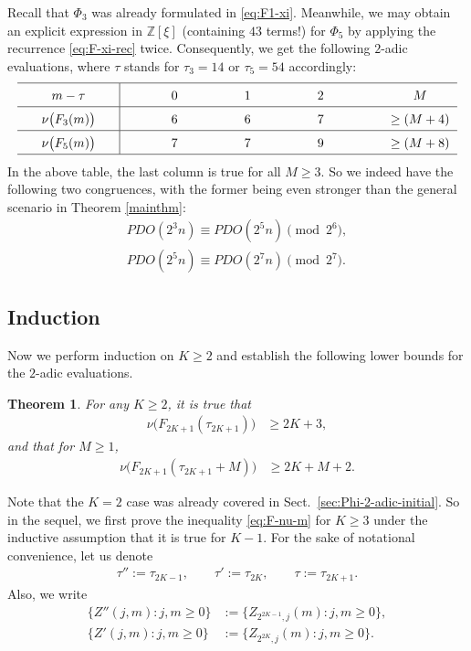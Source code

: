 \documentclass[12pt,reqno]{amsart}
\numberwithin{equation}{section}
\theoremstyle{theorem}
\newtheorem{theorem}{Theorem}
\theoremstyle{definition}
\begin{document}
Recall that $\Phi_3$ was already formulated in \eqref{eq:F1-xi}. Meanwhile, we may obtain an explicit expression in $\mathbb{Z}[\xi]$ (containing $43$ terms!) for $\Phi_5$ by applying the recurrence \eqref{eq:F-xi-rec} twice. Consequently, we get the following $2$-adic evaluations, where $\tau$ stands for $\tau_3=14$ or $\tau_5=54$ accordingly:
\begin{align*}
	\renewcommand\arraystretch{1.5}
	\begin{tabular*}{\textwidth}{p{1pt}cp{1pt}|@{\extracolsep{\fill}}cccc}
		\hline
		& $m-\tau$ && $0$ & $1$ & $2$ & $M$ \\
		\hline
		& $\nu\big(F_3(m)\big)$ && $6$ & $6$ & $7$ & $\ge (M+4)$ \\
		\hline
		& $\nu\big(F_5(m)\big)$ && $7$ & $7$ & $9$ & $\ge (M+8)$ \\
		\hline
	\end{tabular*}
\end{align*}
In the above table, the last column is true for all $M\ge 3$. So we indeed have the following two congruences, with the former being even stronger than the general scenario in Theorem \ref{mainthm}:
\begin{align}
	PDO(2^3n) \equiv PDO(2^5n) \pmod{2^6},\label{eq:2^3-2^5}\\
	PDO(2^5n) \equiv PDO(2^7n) \pmod{2^7}.\label{eq:2^5-2^7}
\end{align}

\subsection{Induction}

Now we perform induction on $K\ge 2$ and establish the following lower bounds for the $2$-adic evaluations.

\begin{theorem}
	For any $K\ge 2$, it is true that
	\begin{align}
		\nu\big(F_{2K+1}(\tau_{2K+1})\big) &\ge 2K+3,\label{eq:F-nu-0}
	\end{align}
	and that for $M\ge 1$,
	\begin{align}\label{eq:F-nu-m}
		\nu\big(F_{2K+1}(\tau_{2K+1}+M)\big) &\ge 2K+M+2.
	\end{align}
\end{theorem}

Note that the $K=2$ case was already covered in Sect.~\ref{sec:Phi-2-adic-initial}. So in the sequel, we first prove the inequality \eqref{eq:F-nu-m} for $K\ge 3$ under the inductive assumption that it is true for $K-1$. For the sake of notational convenience, let us denote
\begin{align*}
	\tau'':=\tau_{2K-1},\qquad \tau':=\tau_{2K}, \qquad \tau:=\tau_{2K+1}.
\end{align*}
Also, we write
\begin{align*}
	\{Z''(j,m):j,m\ge 0\}&:=\{Z_{2^{2K-1},j}(m):j,m\ge 0\},\\
	\{Z'(j,m):j,m\ge 0\}&:=\{Z_{2^{2K},j}(m):j,m\ge 0\}.
\end{align*}
\end{document}
